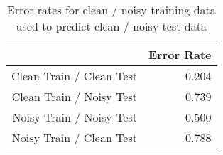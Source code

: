 \begin{table}[ht]
\begin{center}
\begin{tabular}{rr}
  \hline
 & Error Rate \\ 
  \hline
Clean Train / Clean Test & 0.204 \\ 
  Clean Train / Noisy Test & 0.739 \\ 
  Noisy Train / Noisy Test & 0.500 \\ 
  Noisy Train / Clean Test & 0.788 \\ 
   \hline
\end{tabular}
\caption{Error rates for clean / noisy training data used to predict clean / noisy test data}
\end{center}
\end{table}

